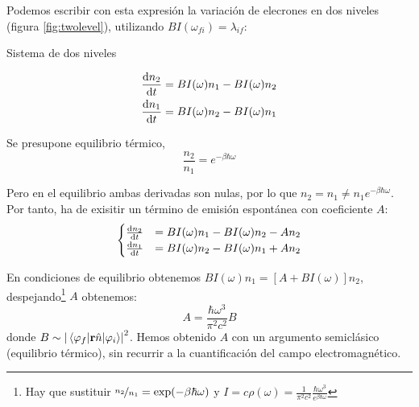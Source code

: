 Podemos escribir con esta expresión la variación de elecrones en dos
niveles (figura \ref{fig:twolevel}), utilizando $B I(\omega_{fi})=\lambda_{if}$:

\begin{marginfigure}
  \caption{Sistema de dos niveles}
  \label{fig:twolevel}
\end{marginfigure}

\begin{equation}
  \begin{split}
    \dv{n_2}{t} &= B I(\omega) n_1 - B I(\omega) n_2 \\
    \dv{n_1}{t} &= B I(\omega) n_2 - B I(\omega) n_1 \\
  \end{split}
\end{equation}

Se presupone equilibrio térmico,
\begin{equation}
  \frac{n_2}{n_1} = e^{-\beta\hbar\omega}
\end{equation}

Pero en el equilibrio ambas derivadas son nulas, por lo que $n_2 = n_1
\neq n_1 e^{-\beta \hbar\omega}$. Por tanto, ha de exisitir un término
de emisión espontánea con coeficiente $A$:
\begin{equation}
  \begin{cases}
    \dv{n_2}{t} &= B I(\omega) n_1 - B I(\omega) n_2 - An_2 \\
    \dv{n_1}{t} &= B I(\omega) n_2 - B I(\omega) n_1 + An_2\\
  \end{cases}
\end{equation}

En condiciones de equilibrio obtenemos $B I(\omega) n_1 = [A+B
I(\omega)] n_2$, despejando\footnote{Hay que sustituir
  $\nicefrac{n_2}{n_1}=\exp(-\beta \hbar\omega)$ y $I = c\rho(\omega)=
  \frac{1}{\pi^2c^2}\frac{\hbar\omega^3}{e^{\beta \hbar\omega}}$} $A$ obtenemos:
\begin{equation}
  A = \frac{\hbar\omega^3}{\pi^2c^2}B 
\end{equation}
donde $B\sim \abs{\mel{\varphi_f}{\bm{\mathrm{r}}\hat{n}}{\varphi_i}}^2$. Hemos
obtenido $A$ con un argumento semiclásico (equilibrio térmico), sin
recurrir a la cuantificación del campo electromagnético.

